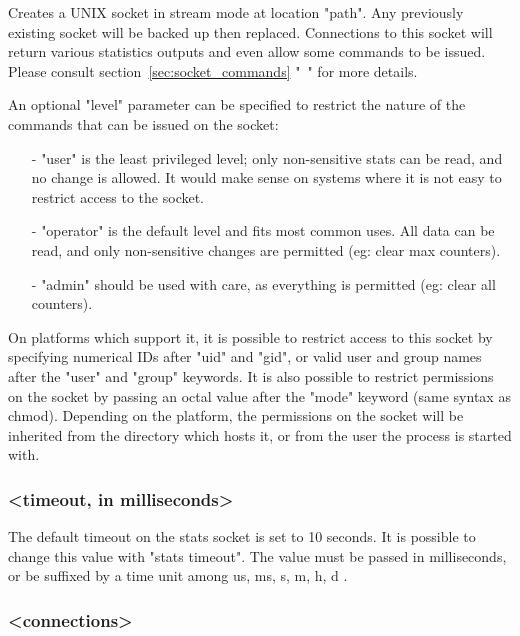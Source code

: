 Creates a UNIX socket in stream mode at location "path". Any previously
existing socket will be backed up then replaced. Connections to this socket
will return various statistics outputs and even allow some commands to be
issued. Please consult section~\ref{sec:socket_commands}
"~" for more details.

An optional "level" parameter can be specified to restrict the nature of
the commands that can be issued on the socket:

\begin{itemize}
\item[-] "user" is the least privileged level; only non-sensitive stats can be
  read, and no change is allowed. It would make sense on systems where it
  is not easy to restrict access to the socket.

\item[-] "operator" is the default level and fits most common uses. All data can
  be read, and only non-sensitive changes are permitted (eg: clear max
  counters).

\item[-] "admin" should be used with care, as everything is permitted (eg: clear
  all counters).
\end{itemize}
  
On platforms which support it, it is possible to restrict access to this
socket by specifying numerical IDs after "uid" and "gid", or valid user and
group names after the "user" and "group" keywords. It is also possible to
restrict permissions on the socket by passing an octal value after the "mode"
keyword (same syntax as chmod). Depending on the platform, the permissions on
the socket will be inherited from the directory which hosts it, or from the
user the process is started with.

\subsubsection[stats timeout]{ <timeout, in milliseconds>}

The default timeout on the stats socket is set to 10 seconds. It is possible
to change this value with "stats timeout". The value must be passed in
milliseconds, or be suffixed by a time unit among { us, ms, s, m, h, d }.

\subsubsection[stats maxconn]{ <connections>}

